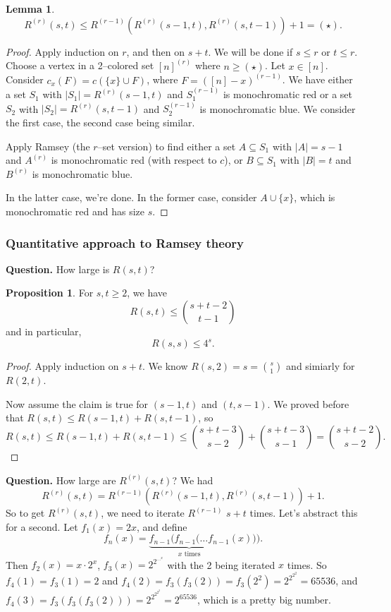 \documentclass{article}
\theoremstyle{definition}
\newtheorem{lemma}[theorem]{Lemma}
\newtheorem{prop}[theorem]{Proposition}
\begin{document}
\begin{lemma}
    $$R^{(r)}(s,t)\le R^{(r-1)}(R^{(r)}(s-1,t),R^{(r)}(s,t-1))+1 = (\star).$$
\end{lemma}
\begin{proof}
    Apply induction on $r$, and then on $s+t$. We will be done if $s\le r$ or $t\le r$. Choose a vertex in a 2--colored set $[n]^{(r)}$ where $n\ge (\star)$. Let $x \in [n]$. Consider $c_x(F) = c(\{x\} \cup F)$, where $F = ([n]-x)^{(r-1)}$. We have either a set $S_1$ with $|S_1|=R^{(r)}(s-1,t)$ and $S_1^{(r-1)}$ is monochromatic red or a set $S_2$ with $|S_2| = R^{(r)}(s,t-1)$ and $S_2^{(r-1)}$ is monochromatic blue. We consider the first case, the second case being similar.

    Apply Ramsey (the $r$--set version) to find either a set $A \subseteq S_1$ with $|A|=s-1$ and $A^{(r)}$ is monochromatic red (with respect to $c$), or $B \subseteq S_1$ with $|B|=t$ and $B^{(r)}$ is monochromatic blue. 

    In the latter case, we're done. In the former case, consider $A \cup \{x\}$, which is monochromatic red and has size $s$.
\end{proof} 

\subsubsection*{Quantitative approach to Ramsey theory}

\textbf{Question.} How large is $R(s,t)$?
\begin{prop}
    For $s,t\ge 2$, we have \[
    R(s,t) \le {{s+t-2}\choose{t-1}}
    \]
    and in particular, \[
    R(s,s)\le 4^s.
    \]
\end{prop}
\begin{proof}
    Apply induction on $s+t$. We know $R(s,2)=s={s\choose{1}}$ and simiarly for $R(2,t)$.

    Now assume the claim is true for $(s-1,t)$ and $(t,s-1)$. We proved before that $R(s,t)\le R(s-1,t)+R(s,t-1)$, so
    \[
        R(s,t)\le R(s-1,t)+R(s,t-1) \le {{s+t-3}\choose{s-2}} + {{s+t-3}\choose{s-1}} = {{s+t-2}\choose{s-2}}.
    \]
\end{proof}


\textbf{Question.} How large are $R^{(r)}(s,t)$? We had
\[
R^{(r)}(s,t)=R^{(r-1)}(R^{(r)}(s-1,t),R^{(r)}(s,t-1))+1.
\]
So to get $R^{(r)}(s,t)$, we need to iterate $R^{(r-1)}$ $s+t$ times. Let's abstract this for a second. Let $f_1(x)=2x$, and define \[
f_n(x)=\underbrace{f_{n-1}(f_{n-1}(\ldots f_{n-1}}_{x \text{ times}}(x))).
\]
Then $f_2(x)=x\cdot 2^x$, $f_3(x)=2^{2^{\ldots^{x}}}$ with the 2 being iterated $x$ times. So $f_4(1)=f_3(1)=2$ and $f_4(2)=f_3(f_3(2))=f_3(2^2)=2^{2^{2^{2}}} = 65536$, and $f_4(3)=f_3(f_3(f_3(2))) = 2^{2^{2^{2^{2}}}}= 2^{65536}$, which is a pretty big number.
\end{document}
